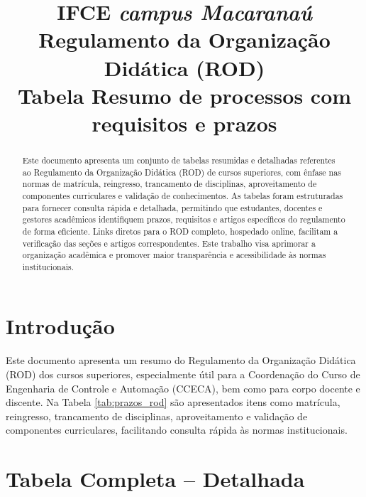 \documentclass[authoryear]{elsarticle}
\begin{document}
	
	\begin{frontmatter}
		\title{IFCE \textit{campus Macaranaú}\\Regulamento da Organização Didática (ROD)\\
			Tabela Resumo de processos com requisitos e prazos}
		
		\begin{abstract}
			Este documento apresenta um conjunto de tabelas resumidas e detalhadas referentes ao Regulamento da Organização Didática (ROD) de cursos superiores, com ênfase nas normas de matrícula, reingresso, trancamento de disciplinas, aproveitamento de componentes curriculares e validação de conhecimentos. As tabelas foram estruturadas para fornecer consulta rápida e detalhada, permitindo que estudantes, docentes e gestores acadêmicos identifiquem prazos, requisitos e artigos específicos do regulamento de forma eficiente. Links diretos para o ROD completo, hospedado online, facilitam a verificação das seções e artigos correspondentes. Este trabalho visa aprimorar a organização acadêmica e promover maior transparência e acessibilidade às normas institucionais.
		\end{abstract}
		
	\end{frontmatter}
	
\section*{Introdução}
Este documento apresenta um resumo do Regulamento da Organização Didática (ROD) dos cursos superiores, especialmente útil para a Coordenação do Curso de Engenharia de Controle e Automação (CCECA), bem como para corpo docente e discente. Na Tabela \ref{tab:prazos_rod} são apresentados itens como matrícula, reingresso, trancamento de disciplinas, aproveitamento e validação de componentes curriculares, facilitando consulta rápida às normas institucionais.


\section*{Tabela Completa – Detalhada}
\scriptsize
\end{document}

